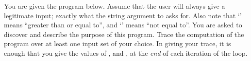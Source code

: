 \documentclass[11pt]{exam}
\begin{document}

\vspace{10pt}
\begin{center}
\end{center}
\vspace{10pt}

\begin{questions}

\question 

You are given the program below. Assume that the user will always give a legitimate input; exactly what the string argument to  asks for. Also note that `\pyv{>=}' means ``greater than or equal to'',  and `\pyv{!=}' means ``not equal to''. You are asked to discover and describe the purpose of this program. Trace the computation of the program over at least one input set of your choice. In giving your trace, it is enough that you give the values of ,  and , at the \emph{end} of each iteration of the  loop. 


\begin{ucodeframe}
\end{ucodeframe}

\end{questions}
\end{document}
